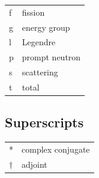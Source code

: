 \documentclass[10pt]{article}
\begin{document}
\begin{flushleft}
\begin{tabular}{l l}
f & fission\\
g & energy group\\
l & Legendre\\
p & prompt neutron\\
s & scattering\\
t & total\\
\end{tabular}

\subsection{Superscripts}
\begin{tabular}{l l}
* & complex conjugate\\
\(\dagger\) & adjoint\\
\end{tabular}

\end{flushleft}
\end{document}
